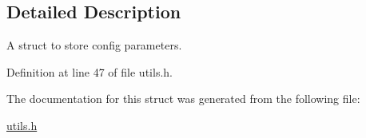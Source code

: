 \subsection{Detailed Description}
A struct to store config parameters. 

Definition at line 47 of file utils.\-h.



The documentation for this struct was generated from the following file\-:\begin{DoxyCompactItemize}
\item 
\hyperlink{utils_8h}{utils.\-h}\end{DoxyCompactItemize}
